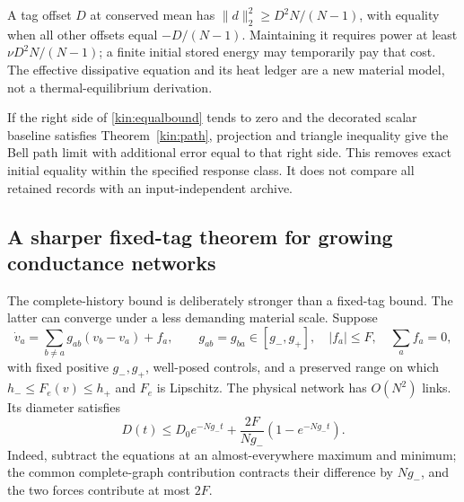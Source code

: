 \documentclass[11pt,oneside,openany]{book}
\theoremstyle{definition}
\theoremstyle{remark}\newtheorem{remark}[theorem]{Remark}
\begin{document}
A tag offset $D$ at conserved mean has
$\|d\|_2^2\ge D^2N/(N-1)$, with equality when all other offsets equal
$-D/(N-1)$. Maintaining it requires power at least
$\nu D^2N/(N-1)$; a finite initial stored energy may temporarily pay that
cost. The effective dissipative equation and its heat ledger are a new
material model, not a thermal-equilibrium derivation.

If the right side of \eqref{kin:equalbound} tends to zero and the decorated
scalar baseline satisfies Theorem~\ref{kin:path}, projection and triangle
inequality give the Bell path limit with additional error equal to that
right side. This removes exact initial equality within the specified
response class. It does not compare all retained records with an
input-independent archive.


\subsection{A sharper fixed-tag theorem for growing conductance networks}
The complete-history bound is deliberately stronger than a fixed-tag bound.
The latter can converge under a less demanding material scale. Suppose
\[
 \dot v_a=\sum_{b\ne a}g_{ab}(v_b-v_a)+f_a,
 \qquad g_{ab}=g_{ba}\in[g_-,g_+],\quad |f_a|\le F,
 \quad\sum_af_a=0,
\]
with fixed positive $g_-,g_+$, well-posed controls, and a preserved range on
which $h_-\le F_e(v)\le h_+$ and $F_e$ is Lipschitz. The physical network
has $O(N^2)$ links. Its diameter satisfies
\begin{equation}
 D(t)\le D_0e^{-Ng_-t}+\frac{2F}{Ng_-}(1-e^{-Ng_-t}).
 \label{kin:networkdiameter}
\end{equation}
Indeed, subtract the equations at an almost-everywhere maximum and minimum;
the common complete-graph contribution contracts their difference by
$Ng_-$, and the two forces contribute at most $2F$.
\end{document}
